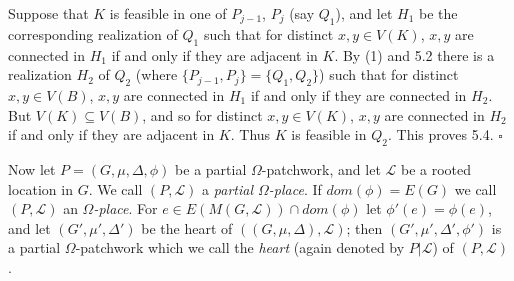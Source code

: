 Suppose that $K$ is feasible in one of $P_{j-1}$, $P_j$ (say $Q_1$), and let $H_1$ be the corresponding realization of $Q_1$ such that for distinct $x, y \in V(K)$, $x, y$ are connected in $H_1$ if and only if they are adjacent in $K$. By (1) and 5.2 there is a realization $H_2$ of $Q_2$ (where $\{P_{j-1}, P_j\} = \{Q_1, Q_2\}$) such that for distinct $x, y \in V(B)$, $x, y$ are connected in $H_1$ if and only if they are connected in $H_2$. But $V(K) \subseteq V(B)$, and so for distinct $x, y \in V(K)$, $x, y$ are connected in $H_2$ if and only if they are adjacent in $K$. Thus $K$ is feasible in $Q_2$. This proves 5.4. $\square$

Now let $P = (G, \mu, \Delta, \phi)$ be a partial $\Omega$-patchwork, and let $\mathscr{L}$ be a rooted location in $G$. We call $(P, \mathscr{L})$ a \textit{partial $\Omega$-place}. If $dom(\phi) = E(G)$ we call $(P, \mathscr{L})$ an \textit{$\Omega$-place}. For $e \in E(M(G, \mathscr{L})) \cap dom(\phi)$ let $\phi'(e) = \phi(e)$, and let $(G', \mu', \Delta')$ be the heart of $((G, \mu, \Delta), \mathscr{L})$; then $(G', \mu', \Delta', \phi')$ is a partial $\Omega$-patchwork which we call the \textit{heart} (again denoted by $P | \mathscr{L}$) of $(P, \mathscr{L})$.
